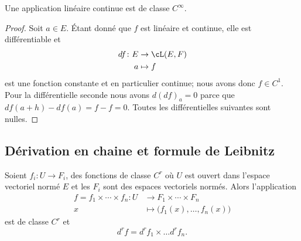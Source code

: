 \begin{lemma}   \label{LemLLvgPQW}
    Une application linéaire continue est de classe \(  C^{\infty}\).
\end{lemma}

\begin{proof}
    Soit \( a\in E\). Étant donné que \( f\) est linéaire et continue, elle est différentiable et
    \begin{equation}
        \begin{aligned}
            df\colon E&\to \cL(E,F) \\
            a&\mapsto f 
        \end{aligned}
    \end{equation}
    est une fonction constante et en particulier continue; nous avons donc \( f\in C^1\). Pour la différentielle seconde nous avons \( d(df)_a=0\) parce que \( df(a+h)-df(a)=f-f=0\). Toutes les différentielles suivantes sont nulles.
\end{proof}

\subsection{Dérivation en chaine et formule de Leibnitz}

\begin{proposition} \label{PropOYtgIua}
    Soient \( f_i\colon U\to F_i\), des fonctions de classe \( C^r\) où \( U\) est ouvert dans l'espace vectoriel normé \( E\) et les \( F_i\) sont des espaces vectoriels normés. Alors l'application
    \begin{equation}
        \begin{aligned}
        f=f_1\times \cdots\times f_n\colon U&\to F_1\times \cdots\times F_n \\
    x&\mapsto \big( f_1(x),\ldots, f_n(x) \big) 
        \end{aligned}
    \end{equation}
    est de classe \( C^r\) et
    \begin{equation}
    d^rf=d^rf_1\times\ldots d^rf_n.
    \end{equation}
\end{proposition}

